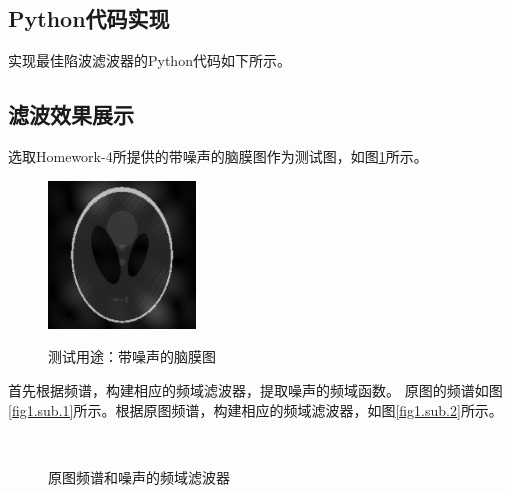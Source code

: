 \documentclass{article}
\begin{document}
\subsection{Python代码实现}
实现最佳陷波滤波器的Python代码如下所示。
 

\subsection{滤波效果展示}
选取Homework-4所提供的带噪声的脑膜图作为测试图，如图\ref{test}所示。
\begin{figure}[H]
	\centering
	{\includegraphics[width=0.35\textwidth]{带噪声的脑膜图.PNG}} 
	\caption{测试用途：带噪声的脑膜图}   \label{test}
\end{figure}


首先根据频谱，构建相应的频域滤波器，提取噪声的频域函数。
原图的频谱如图\ref{fig1.sub.1}所示。根据原图频谱，构建相应的频域滤波器，如图\ref{fig1.sub.2}所示。
\begin{figure}[H]
    \centering
    \,    
    \caption{原图频谱和噪声的频域滤波器}  \label{fig1.main}
\end{figure}
\end{document}
